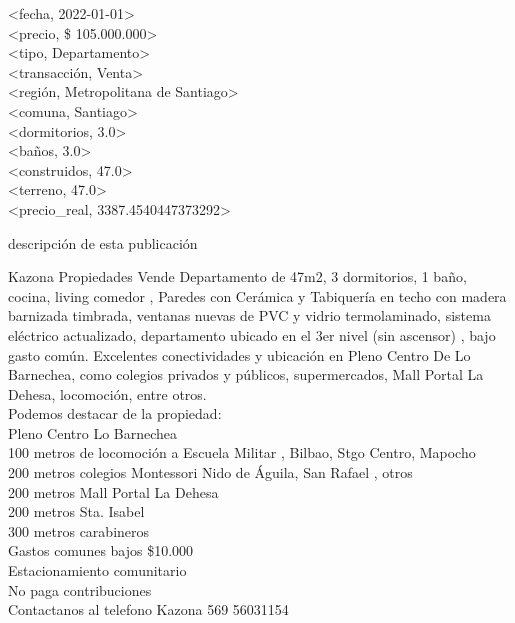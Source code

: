 \begin{tcolorbox}[colback=white,colframe=black!50!white,title=Input]
<fecha, 2022-01-01>\\
<precio, \$ 105.000.000>\\
<tipo, Departamento>\\
<transacci\'on, Venta>\\
<regi\'on, Metropolitana de Santiago>\\
<comuna, Santiago>\\
<dormitorios, 3.0>\\
<ba\~nos, 3.0>\\
<construidos, 47.0>\\
<terreno, 47.0>\\
<precio\_real, 3387.4540447373292>
\end{tcolorbox}
\begin{tcolorbox}[colback=white,colframe=black!50!white,title=Tarea]
descripci\'on de esta publicaci\'on
\end{tcolorbox}
\begin{tcolorbox}[colback=white,colframe=black!50!white,title=Respuesta esperada]
\footnotesize
Kazona Propiedades Vende Departamento de 47m2, 3 dormitorios, 1 ba\~no, cocina, living comedor , Paredes con Cer\'amica y Tabiquer\'ia en techo con madera barnizada timbrada, ventanas nuevas de PVC y vidrio termolaminado, sistema el\'ectrico actualizado, departamento ubicado en el 3er nivel (sin ascensor) , bajo gasto com\'un. Excelentes conectividades y ubicaci\'on en Pleno Centro De Lo Barnechea, como colegios privados y p\'ublicos, supermercados, Mall Portal La Dehesa, locomoci\'on, entre otros.\\
Podemos destacar de la propiedad:\\
Pleno Centro Lo Barnechea\\
100 metros de locomoci\'on a Escuela Militar , Bilbao, Stgo Centro, Mapocho\\
200 metros colegios Montessori Nido de \'Aguila, San Rafael , otros\\
200 metros Mall Portal La Dehesa\\
200 metros Sta. Isabel\\
300 metros carabineros\\
Gastos comunes bajos  \$10.000\\
Estacionamiento comunitario\\
No paga contribuciones\\
Contactanos al telefono Kazona 569 56031154
\end{tcolorbox}

